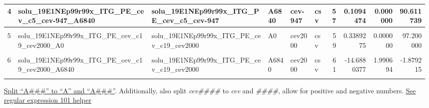 \documentclass[
]{book}
\begin{document}
\begin{table}[!h]
{\begin{tabular}{l|l|l|l|l|l|r|r|r|r}
\hline
4 & solu\_19E1NEp99r99x\_ITG\_PE\_cev\_c5\_cev-947\_A6840 & solu\_19E1NEp99r99x\_ITG\_PE\_cev\_c5\_cev-947 & A6840 & cev-947 & csv & 57 & 0.1094474 & 0.000000 & 90.611739\\
\hline
\cellcolor{gray!6}{5} & \cellcolor{gray!6}{solu\_19E1NEp99r99x\_ITG\_PE\_cev\_c19\_cev2000\_A0} & \cellcolor{gray!6}{solu\_19E1NEp99r99x\_ITG\_PE\_cev\_c19\_cev2000} & \cellcolor{gray!6}{A0} & \cellcolor{gray!6}{cev2000} & \cellcolor{gray!6}{csv} & \cellcolor{gray!6}{9} & \cellcolor{gray!6}{-2.9782236} & \cellcolor{gray!6}{0.000000} & \cellcolor{gray!6}{7.855916}\\
\hline
5 & solu\_19E1NEp99r99x\_ITG\_PE\_cev\_c19\_cev2000\_A0 & solu\_19E1NEp99r99x\_ITG\_PE\_cev\_c19\_cev2000 & A0 & cev2000 & csv & 59 & 0.3389275 & 0.000000 & 97.200000\\
\hline
\cellcolor{gray!6}{6} & \cellcolor{gray!6}{solu\_19E1NEp99r99x\_ITG\_PE\_cev\_c19\_cev2000\_A6840} & \cellcolor{gray!6}{solu\_19E1NEp99r99x\_ITG\_PE\_cev\_c19\_cev2000} & \cellcolor{gray!6}{A6840} & \cellcolor{gray!6}{cev2000} & \cellcolor{gray!6}{csv} & \cellcolor{gray!6}{11} & \cellcolor{gray!6}{-1.7229647} & \cellcolor{gray!6}{0.000000} & \cellcolor{gray!6}{11.961502}\\
\hline
6 & solu\_19E1NEp99r99x\_ITG\_PE\_cev\_c19\_cev2000\_A6840 & solu\_19E1NEp99r99x\_ITG\_PE\_cev\_c19\_cev2000 & A6840 & cev2000 & csv & 61 & -14.6880377 & 1.990694 & -1.879215\\
\hline
\cellcolor{gray!6}{7} & \cellcolor{gray!6}{solu\_19E1NEp99r99x\_ITG\_PE\_cev\_c14\_cev947\_A0} & \cellcolor{gray!6}{solu\_19E1NEp99r99x\_ITG\_PE\_cev\_c14\_cev947} & \cellcolor{gray!6}{A0} & \cellcolor{gray!6}{cev947} & \cellcolor{gray!6}{csv} & \cellcolor{gray!6}{13} & \cellcolor{gray!6}{-1.7623279} & \cellcolor{gray!6}{0.000000} & \cellcolor{gray!6}{16.190257}\\
\hline
\end{tabular}}
\end{table}

\href{https://stackoverflow.com/a/47673097/8280804}{Split ``A\#\#\#'' to ``A'' and ``A\#\#\#''}. Additionally, also split \emph{cev\#\#\#\#} to \emph{cev} and \emph{\#\#\#\#}, allow for positive and negative numbers. \href{https://regex101.com}{See regular expression 101 helper}
\end{document}

